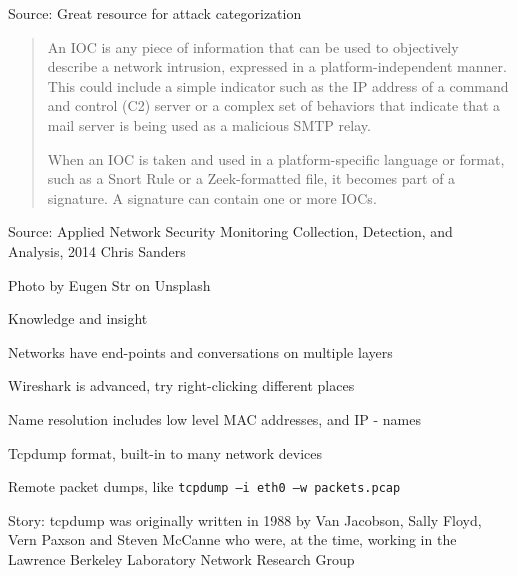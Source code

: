 \documentclass[Screen16to9,17pt]{foils}
\begin{document}


Source:  Great resource for attack categorization



\begin{quote}
An IOC is any piece of information that can be used to objectively describe a network intrusion, expressed in a platform-independent manner. This could include a simple indicator such as the IP address of a command and control (C2) server or a complex set of behaviors that indicate that a mail server is being used as a malicious SMTP relay.

When an IOC is taken and used in a platform-specific language or format, such as a Snort Rule or a Zeek-formatted file, it becomes part of a signature. A signature can contain one or more IOCs.
\end{quote}

Source: Applied Network Security Monitoring Collection, Detection, and Analysis, 2014 Chris Sanders




\hfill Photo by Eugen Str on Unsplash



{\Large Knowledge and insight}
\begin{list2}
\item Networks have end-points and conversations on multiple layers
\item Wireshark is advanced, try right-clicking different places
\item Name resolution includes low level MAC addresses, and IP - names
\end{list2}

\begin{list2}
\item Tcpdump format, built-in to many network devices
\item Remote packet dumps, like \verb+tcpdump –i eth0 –w packets.pcap+
\item Story: tcpdump was originally written in 1988 by Van Jacobson, Sally Floyd, Vern Paxson and Steven McCanne who were, at the time, working in the Lawrence Berkeley Laboratory Network Research Group\\
\end{list2}
\end{document}
